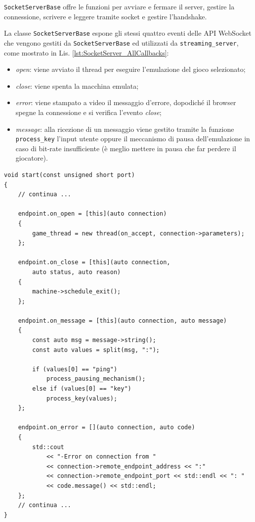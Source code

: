 \verb|SocketServerBase| offre le funzioni per avviare e fermare il server, gestire la connessione, scrivere e leggere tramite socket e gestire l'handshake.

La classe \verb|SocketServerBase| espone gli stessi quattro eventi delle API WebSocket che vengono gestiti da \verb|SocketServerBase| ed utilizzati da \verb|streaming_server|, come mostrato in Lis. \ref{lst:SocketServer_AllCallbacks}:

\begin{itemize}
	\item \textit{open}: viene avviato il thread per eseguire l'emulazione del gioco selezionato;
	\item \textit{close}: viene spenta la macchina emulata;
	\item \textit{error}: viene stampato a video il messaggio d'errore, dopodiché il browser spegne la connessione e si verifica l'evento \textit{close};
	\item \textit{message}: alla ricezione di un messaggio viene gestito tramite la funzione \verb|process_key| l'input utente oppure il meccanismo di pausa dell'emulazione in caso di bit-rate insufficiente (è meglio mettere in pausa che far perdere il giocatore).
\end{itemize}

\begin{lstlisting}[caption=Codice relativo alle callback WebSocket, label={lst:SocketServer_AllCallbacks}]
void start(const unsigned short port)
{
	// continua ...

	endpoint.on_open = [this](auto connection)
	{
		game_thread = new thread(on_accept, connection->parameters);
	};

	endpoint.on_close = [this](auto connection,
		auto status, auto reason)
	{
		machine->schedule_exit();
	};

	endpoint.on_message = [this](auto connection, auto message)
	{
		const auto msg = message->string();
		const auto values = split(msg, ":");

		if (values[0] == "ping")
			process_pausing_mechanism();
		else if (values[0] == "key")
			process_key(values);
	};

	endpoint.on_error = [](auto connection, auto code)
	{
		std::cout
			<< "-Error on connection from "
			<< connection->remote_endpoint_address << ":"
			<< connection->remote_endpoint_port << std::endl << ": "
			<< code.message() << std::endl;
	};
	// continua ...
}
\end{lstlisting}


